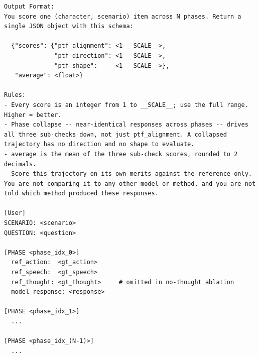 \documentclass[11pt]{article}
\begin{document}
\begin{table}[htbp]
\begin{lstlisting}[basicstyle=\ttfamily\scriptsize]
Output Format:
You score one (character, scenario) item across N phases. Return a single JSON object with this schema:

  {"scores": {"ptf_alignment": <1-__SCALE__>,
              "ptf_direction": <1-__SCALE__>,
              "ptf_shape":     <1-__SCALE__>},
   "average": <float>}

Rules:
- Every score is an integer from 1 to __SCALE__; use the full range. Higher = better.
- Phase collapse -- near-identical responses across phases -- drives all three sub-checks down, not just ptf_alignment. A collapsed trajectory has no direction and no shape to evaluate.
- average is the mean of the three sub-check scores, rounded to 2 decimals.
- Score this trajectory on its own merits against the reference only. You are not comparing it to any other model or method, and you are not told which method produced these responses.

[User]
SCENARIO: <scenario>
QUESTION: <question>

[PHASE <phase_idx_0>]
  ref_action:  <gt_action>
  ref_speech:  <gt_speech>
  ref_thought: <gt_thought>     # omitted in no-thought ablation
  model_response: <response>

[PHASE <phase_idx_1>]
  ...

[PHASE <phase_idx_(N-1)>]
  ...
\end{lstlisting}
\end{table}
\end{document}
